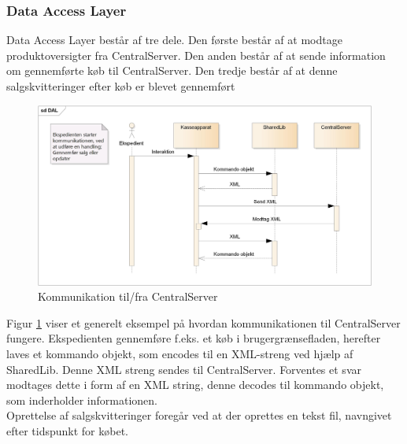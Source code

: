 \subsubsection{Data Access Layer}
Data Access Layer består af tre dele. Den første består af at modtage produktoversigter fra CentralServer. Den anden består af at sende information om gennemførte køb til CentralServer. Den tredje består af at denne salgskvitteringer efter køb er blevet gennemført

\begin{figure}[H]
	\centering
	\includegraphics[width=\textwidth]{Projektbeskrivelse/DesignOgImplementering/Frontend/Pics/DALsq}
	\caption{Kommunikation til/fra CentralServer}
	\label{fig:KAtCS}
\end{figure}

Figur \ref{fig:KAtCS} viser et generelt eksempel på hvordan kommunikationen til CentralServer fungere. Ekspedienten gennemføre f.eks. et køb i brugergrænsefladen, herefter laves et kommando objekt, som encodes til en XML-streng ved hjælp af SharedLib. Denne XML streng sendes til CentralServer. Forventes et svar modtages dette i form af en XML string, denne decodes til kommando objekt, som inderholder informationen.\\
Oprettelse af salgskvitteringer foregår ved at der oprettes en tekst fil, navngivet efter tidspunkt for købet.



